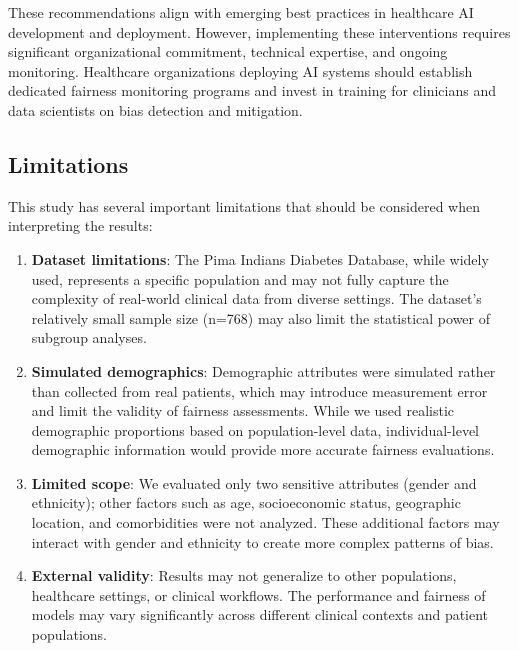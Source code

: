 These recommendations align with emerging best practices in healthcare 
AI development and deployment. However, implementing these interventions 
requires significant organizational commitment, technical expertise, and 
ongoing monitoring. Healthcare organizations deploying AI systems should 
establish dedicated fairness monitoring programs and invest in training 
for clinicians and data scientists on bias detection and mitigation.

\subsection{Limitations}

This study has several important limitations that should be considered 
when interpreting the results:

\begin{enumerate}[leftmargin=*]
    \item \textbf{Dataset limitations}: The Pima Indians Diabetes Database, 
          while widely used, represents a specific population and may not 
          fully capture the complexity of real-world clinical data from 
          diverse settings. The dataset's relatively small sample size 
          (n=768) may also limit the statistical power of subgroup analyses.
    
    \item \textbf{Simulated demographics}: Demographic attributes were 
          simulated rather than collected from real patients, which may 
          introduce measurement error and limit the validity of fairness 
          assessments. While we used realistic demographic proportions 
          based on population-level data, individual-level demographic 
          information would provide more accurate fairness evaluations.
    
    \item \textbf{Limited scope}: We evaluated only two sensitive attributes 
          (gender and ethnicity); other factors such as age, socioeconomic 
          status, geographic location, and comorbidities were not analyzed. 
          These additional factors may interact with gender and ethnicity 
          to create more complex patterns of bias.
    
    \item \textbf{External validity}: Results may not generalize to other 
          populations, healthcare settings, or clinical workflows. The 
          performance and fairness of models may vary significantly across 
          different clinical contexts and patient populations.
    

\end{enumerate}
